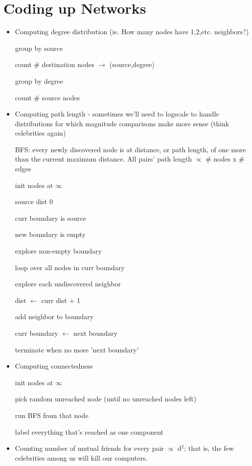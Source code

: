 \section{Coding up Networks}
\begin{itemize}
	\item Computing degree distribution (ie. How many nodes have 1,2,etc. neighbors?)
    
    group by source
    
    count \# destination nodes $\rightarrow$ (source,degree)
    
    group by degree
    
    count \# source nodes
    
    \item Computing path length - sometimes we'll need to logscale to handle distributions for which magnitude comparisons make more sense (think celebrities again)
    
    BFS: every newly discovered node is at distance, or path length, of one more than the current maximum distance. All pairs' path length $\propto$ \# nodes x \# edges
    
    init nodes at $\infty$
    
    	\quad source dist 0
    
    	\quad curr boundary is source
    
    	\quad new boundary is empty
    
    explore non-empty boundary
    
    loop over all nodes in curr boundary
    
    explore each undiscovered neighbor
    
    	\quad dist $\leftarrow$ curr dist + 1
        
    	\quad add neighbor to boundary 
        
    curr boundary $\leftarrow$ next boundary
    
    terminate when no more 'next boundary'
    
	\item Computing connectedness
    
    init nodes at $\infty$
    
    pick random unreached node (until no unreached nodes left)
    
    run BFS from that node
    
    	\quad label everything that's reached as one component
        
	\item Counting number of mutual friends for every pair $\propto$ d$^{2}$; that is, the few celebrities among us will kill our computers.
    

\end{itemize}
